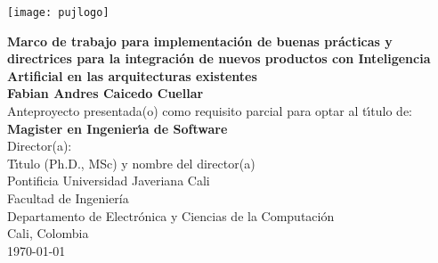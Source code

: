 \begin{center}
\thispagestyle{empty}
\vspace*{-2cm}
\begin{center}
    \texttt{[image: pujlogo]}~\\[1cm]
\end{center}
\textbf{\huge
Marco de trabajo para implementación de buenas prácticas y directrices para la integración de nuevos productos con Inteligencia Artificial en las arquitecturas existentes}\\[1.3cm]
\Large\textbf{Fabian Andres Caicedo Cuellar}\\[1cm]
\small Anteproyecto presentada(o) como requisito parcial para optar al
t\'{\i}tulo de:\\
\textbf{Magister en Ingenier\'{\i}a de Software}\\[1cm]
Director(a):\\
T\'{\i}tulo (Ph.D., MSc) y nombre del director(a)\\[1.4cm]

Pontificia Universidad Javeriana Cali\\
Facultad de Ingeniería\\
Departamento de Electrónica y Ciencias de la Computación\\
Cali, Colombia\\
\today\\
\end{center}
